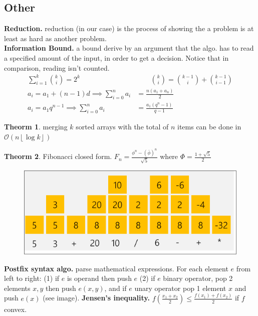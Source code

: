 \documentclass[]{article}
\newcommand\compactsection   [1]        {\vspace{-10pt}\section{#1}\vspace{-6pt}}
\theoremstyle{definition}
\newtheorem{Theorem}{\color{theoColor}Theorm}
\newcommand\theo  [1] {\begin{Theorem}#1\end{Theorem}}
\newcommand\oc    {\mathcal{O}}
\newcommand\rf    {\right\rfloor}
\newcommand\lf    {\left\lfloor}
\newcommand\floor [1] {\lf #1 \rf}
\newcommand\sumni     {\sum_{i = 0}^{n}}
\begin{document}
\begin{multicols}{4}
		
		\compactsection{Other}
			\textbf{Reduction. }reduction (in our case) is the process of showing the a problem is at least as hard as another problem. \\
			\textbf{Information Bound. }a bound derive by an argument that the algo. has to read a specified amount of the input, in order to get a decision. Notice that in comparison, reading isn't counted. 
			\vspace{-9pt}\begin{align*}
				\textstyle \sum_{i = 1}^{k}\binom{k}{i} = 2^{k} \quad&\quad\quad \textstyle \binom{k}{i} = \binom{k - 1}{i} + \binom{k - 1}{i - 1} \\ 
				\textstyle a_i = a_1 + (n - 1)d \implies \sumni a_i  &= \textstyle \frac{n(a_1 + a_n)}{2} \\
				\textstyle a_i = a_1 q^{n - 1} \implies \sumni a_i   &=  \textstyle \frac{a_1(q^{n} - 1)}{q - 1}
			\end{align*}\vspace{-15pt}
			\theo{merging $k$ sorted arrays with the total of $n$ items can be done in $\oc(n \floor{\log k})$}
			\theo{Fibonacci closed form. $\textstyle F_n = \frac{\phi^{n} - (\bar \phi)^{n}}{\sqrt 5}$ where $\textstyle \Phi = \frac{1 + \sqrt 5}{2}$}
			\begin{figure}
				\includegraphics[width=\linewidth]{images/postfix}
			\end{figure}
			\textbf{Postfix syntax algo. }parse mathematical expressions. For each element $e$ from left to right: (1) if $e$ is operand then push $e$ (2) if $e$ binary operator, pop 2 elements $x, y$ then push $e(x, y)$, and if $e$ unary operator pop 1 element $x$ and push $e(x)$ (see image). 
			\textbf{Jensen's inequality. }$\textstyle f(\frac{x_1 + x_2}{2}) \le \frac{f(x_1) + f(x_2)}{2}$ if $f$ convex. 
		

\end{multicols}
\end{document}
